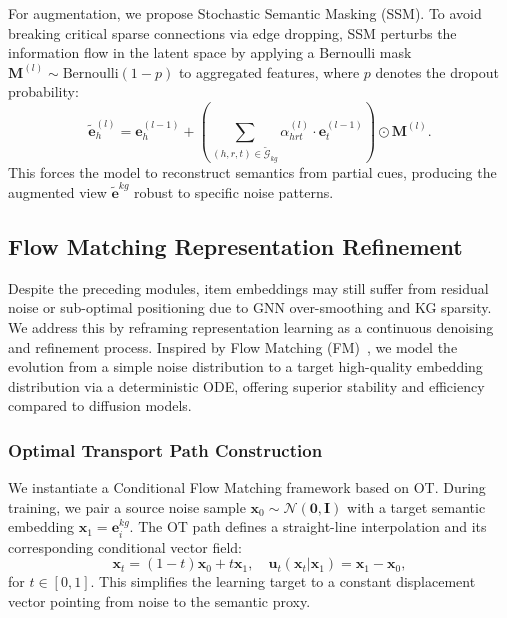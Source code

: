 For augmentation, we propose Stochastic Semantic Masking (SSM). To avoid breaking critical sparse connections via edge dropping, SSM perturbs the information flow in the latent space by applying a Bernoulli mask $\mathbf{M}^{(l)} \sim \text{Bernoulli}(1-p)$ to aggregated features, where $p$ denotes the dropout probability:
\begin{equation}
	\tilde{\mathbf{e}}_h^{(l)} = \mathbf{e}_h^{(l-1)} + \left( \sum_{(h,r,t) \in \tilde{\mathcal{G}}_{kg}} \alpha_{hrt}^{(l)} \cdot \mathbf{e}_t^{(l-1)} \right) \odot \mathbf{M}^{(l)}.
\end{equation}
This forces the model to reconstruct semantics from partial cues, producing the augmented view $\tilde{\mathbf{e}}^{kg}$ robust to specific noise patterns.
\subsection{Flow Matching Representation Refinement}
Despite the preceding modules, item embeddings may still suffer from residual noise or sub-optimal positioning due to GNN over-smoothing and KG sparsity. We address this by reframing representation learning as a continuous denoising and refinement process. Inspired by Flow Matching (FM)~\cite{lipman2023flow}, we model the evolution from a simple noise distribution to a target high-quality embedding distribution via a deterministic ODE, offering superior stability and efficiency compared to diffusion models.

%

\subsubsection{\textbf{Optimal Transport Path Construction}}
We instantiate a Conditional Flow Matching framework based on OT. During training, we pair a source noise sample \(\mathbf{x}_0 \sim \mathcal{N}(\mathbf{0}, \mathbf{I})\) with a target semantic embedding \(\mathbf{x}_1 = \mathbf{e}_i^{kg}\). The OT path defines a straight-line interpolation and its corresponding conditional vector field:
\begin{equation}
	\mathbf{x}_t = (1 - t)\mathbf{x}_0 + t\mathbf{x}_1, \quad \mathbf{u}_t(\mathbf{x}_t | \mathbf{x}_1) = \mathbf{x}_1 - \mathbf{x}_0,
\end{equation}
for \(t \in [0,1]\). This simplifies the learning target to a constant displacement vector pointing from noise to the semantic proxy.

